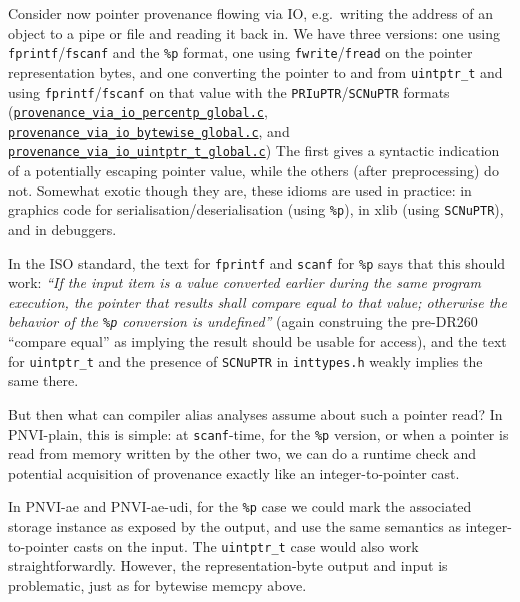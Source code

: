 \documentclass[acmsmall,review,screen]{acmart}\settopmatter{printfolios=true,printccs=false,printacmref=false}
\newcommand{\myparagraph}[1]{\vspace{0.5\baselineskip}\par\noindent{\normalsize\bfseries{#1}}\quad}
\newcommand{\mytesturl}[1]{https://cerberus.cl.cam.ac.uk/cerberus?defacto/#1}
\newcommand{\mytestlink}[2]{\href{\mytesturl{#1}}{#2}}
\newcommand{\mylsttestlink}[1]{\mytestlink{#1}{\lstinline{#1}}}
\newcommand{\mylistingmargin}{5mm}
\newcommand{\myqtlinkexample}[4]{{\vspace*{-0.5\baselineskip}\par{\noindent\small\hspace*{\mylistingmargin}\lstinline{//} #4\vspace*{-0.25\baselineskip}}}}
\newcommand{\myqtexample}[3]{\myqtlinkexample{#1}{#2}{#3}{{\mylsttestlink{#2}}}}
\newcommand{\myfooexamplename}[1]{\mylsttestlink{#1}}
\begin{document}
\myparagraph{Pointer provenance via IO}
Consider now pointer provenance flowing 
via IO, e.g.~writing the address of an object to a pipe or file and reading it
back in.
We have three versions: one using \lstinline{fprintf}/\lstinline{fscanf} and
the \lstinline{%p} format, one using \lstinline{fwrite}/\lstinline{fread} on
the pointer representation bytes, and one converting the pointer to
and from \lstinline{uintptr_t} and using
\lstinline{fprintf}/\lstinline{fscanf} on that value with the
\lstinline{PRIuPTR}/\lstinline{SCNuPTR} formats
(\myfooexamplename{provenance_via_io_percentp_global.c},
\myfooexamplename{provenance_via_io_bytewise_global.c}, and
\myfooexamplename{provenance_via_io_uintptr_t_global.c})
The first gives a syntactic indication of a potentially
escaping pointer value, while the others (after preprocessing) do
not. 
%
%
Somewhat exotic though they are, these idioms are used in practice: in 
graphics code for
serialisation/deserialisation (using \lstinline{%p}), 
in xlib (using \lstinline{SCNuPTR}), and in debuggers.

In the ISO standard, the text for \lstinline{fprintf} and
\lstinline{scanf} for \lstinline{%p} says that this should work: \emph{``If
  the input item is a value converted earlier during the same program
  execution, the pointer that results shall compare equal to that
  value; otherwise the behavior of the \texttt{\%p} conversion is
  undefined''}  (again construing the pre-DR260 ``compare equal'' as implying
  the result should be usable for access),
and the text for \lstinline{uintptr_t} and the presence of
\lstinline{SCNuPTR} in \lstinline{inttypes.h} weakly implies the same there.

But then what can compiler alias analyses assume about such a pointer
read?  
In PNVI-plain, this is simple: at \lstinline{scanf}-time, for the \lstinline{%p}
version, or when a pointer is read from memory written by the
other two, we can do a runtime check and potential acquisition of
provenance exactly like an integer-to-pointer cast.
%

In PNVI-ae and PNVI-ae-udi, for the \lstinline{%p}
  case we could mark the associated storage instance as exposed by the
  output, and
  use
  the same semantics as integer-to-pointer casts on the input.
  The \lstinline{uintptr_t} case would also work straightforwardly.
  However, the representation-byte output and input is problematic,
  just as for bytewise memcpy above.   
\end{document}

